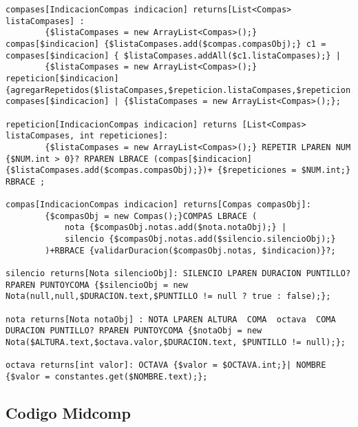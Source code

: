 \begin{verbatim}
compases[IndicacionCompas indicacion] returns[List<Compas> listaCompases] : 
		{$listaCompases = new ArrayList<Compas>();} compas[$indicacion] {$listaCompases.add($compas.compasObj);} c1 = compases[$indicacion] { $listaCompases.addAll($c1.listaCompases);} | 
		{$listaCompases = new ArrayList<Compas>();} repeticion[$indicacion] {agregarRepetidos($listaCompases,$repeticion.listaCompases,$repeticion.repeticiones);} compases[$indicacion] | {$listaCompases = new ArrayList<Compas>();};

repeticion[IndicacionCompas indicacion] returns [List<Compas> listaCompases, int repeticiones]:
		{$listaCompases = new ArrayList<Compas>();} REPETIR LPAREN NUM {$NUM.int > 0}? RPAREN LBRACE (compas[$indicacion] {$listaCompases.add($compas.compasObj);})+ {$repeticiones = $NUM.int;} RBRACE ;

compas[IndicacionCompas indicacion] returns[Compas compasObj]: 
		{$compasObj = new Compas();}COMPAS LBRACE (
			nota {$compasObj.notas.add($nota.notaObj);} |
			silencio {$compasObj.notas.add($silencio.silencioObj);}
		)+RBRACE {validarDuracion($compasObj.notas, $indicacion)}?;

silencio returns[Nota silencioObj]: SILENCIO LPAREN DURACION PUNTILLO? RPAREN PUNTOYCOMA {$silencioObj = new Nota(null,null,$DURACION.text,$PUNTILLO != null ? true : false);};

nota returns[Nota notaObj] : NOTA LPAREN ALTURA  COMA  octava  COMA DURACION PUNTILLO? RPAREN PUNTOYCOMA {$notaObj = new Nota($ALTURA.text,$octava.valor,$DURACION.text, $PUNTILLO != null);};

octava returns[int valor]: OCTAVA {$valor = $OCTAVA.int;}| NOMBRE {$valor = constantes.get($NOMBRE.text);};

\end{verbatim}


\subsection{Codigo Midcomp}

